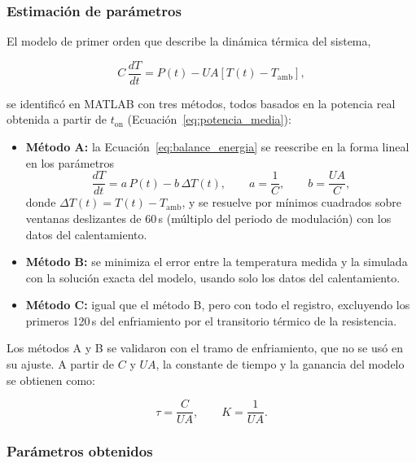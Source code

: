 \subsubsection{Estimación de parámetros}

El modelo de primer orden que describe la dinámica térmica del sistema,

\begin{equation}
C\,\frac{dT}{dt} = P(t) - UA \left[T(t) - T_{\mathrm{amb}}\right],
\label{eq:balance_energia}
\end{equation}

se identificó en MATLAB con tres métodos, todos basados en la potencia real obtenida a partir de $t_{\mathrm{on}}$ (Ecuación~\ref{eq:potencia_media}):

\begin{itemize}
\item \textbf{Método A:} la Ecuación~\ref{eq:balance_energia} se reescribe en la forma lineal en los parámetros
\begin{equation}
\frac{dT}{dt} = a\,P(t) - b\,\Delta T(t), \qquad a = \frac{1}{C}, \qquad b = \frac{UA}{C},
\label{eq:regresion_lineal}
\end{equation}
donde $\Delta T(t) = T(t) - T_{\mathrm{amb}}$, y se resuelve por mínimos cuadrados sobre ventanas deslizantes de 60\,s (múltiplo del periodo de modulación) con los datos del calentamiento.
\item \textbf{Método B:} se minimiza el error entre la temperatura medida y la simulada con la solución exacta del modelo, usando solo los datos del calentamiento.
\item \textbf{Método C:} igual que el método B, pero con todo el registro, excluyendo los primeros 120\,s del enfriamiento por el transitorio térmico de la resistencia.
\end{itemize}

Los métodos A y B se validaron con el tramo de enfriamiento, que no se usó en su ajuste. A partir de $C$ y $UA$, la constante de tiempo y la ganancia del modelo se obtienen como:

\begin{equation}
\tau = \frac{C}{UA}, \qquad K = \frac{1}{UA}.
\label{eq:parametros_recuperados}
\end{equation}

\subsubsection{Parámetros obtenidos}

